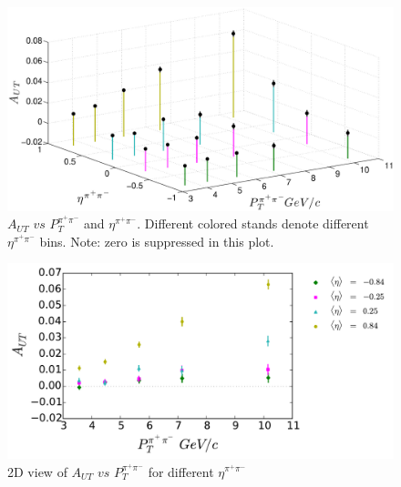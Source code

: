 \documentclass[letterpaper, abstract = on,listof=totoc, bibliography=totoc]{scrreprt}
\newcommand{\ptpair}{P_{T}^{\pi^+\pi^-}}
\newcommand{\etapair}{\eta^{\pi^+\pi^-}}
\begin{document}
\begin{figure}
\begin{center}
\includegraphics[width = 1\textwidth]{ptEta3d82415}
\caption[Asymmetry $vs$ $\etapair$ and $\ptpair$ 2D binning]{$A_{UT}$ $vs$ $\ptpair$ and $\etapair$. Different colored stands denote different $\etapair$ bins. Note: zero is suppressed in this plot.}
\label{fig:3dPtEta}
\end{center}
\end{figure}


\begin{figure}
\begin{center}
\includegraphics[width = 1\textwidth]{Asym2dProjPtEta82415_difMark5}
\caption[2D view of $A_{UT}$ $vs$ $\ptpair$ for different $\etapair$]{2D view of $A_{UT}$ $vs$ $\ptpair$ for different $\etapair$}
\label{fig:2dPtEta}
\end{center}
\end{figure}
\end{document}
